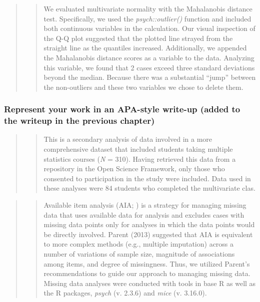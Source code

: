 \documentclass[
  11pt,
]{book}
\begin{document}
\begin{quote}
\begin{quote}
We evaluated multivariate normality with the Mahalanobis distance test. Specifically, we used the \emph{psych::outlier()} function and included both continuous variables in the calculation. Our visual inspection of the Q-Q plot suggested that the plotted line strayed from the straight line as the quantiles increased. Additionally, we appended the Mahalanobis distance scores as a variable to the data. Analyzing this variable, we found that 2 cases exceed three standard deviations beyond the median. Because there was a substantial ``jump'' between the non-outliers and these two variables we chose to delete them.
\end{quote}
\end{quote}

\hypertarget{represent-your-work-in-an-apa-style-write-up-added-to-the-writeup-in-the-previous-chapter-1}{%
\subsubsection*{Represent your work in an APA-style write-up (added to the writeup in the previous chapter)}\label{represent-your-work-in-an-apa-style-write-up-added-to-the-writeup-in-the-previous-chapter-1}}


\begin{quote}
\begin{quote}
This is a secondary analysis of data involved in a more comprehensive dataset that included students taking multiple statistics courses (\emph{N} = 310). Having retrieved this data from a repository in the Open Science Framework, only those who consented to participation in the study were included. Data used in these analyses were 84 students who completed the multivariate clas.
\end{quote}
\end{quote}

\begin{quote}
\begin{quote}
Available item analysis (AIA; \citep{parent_handling_2013}) is a strategy for managing missing data that uses available data for analysis and excludes cases with missing data points only for analyses in which the data points would be directly involved. Parent (2013) suggested that AIA is equivalent to more complex methods (e.g., multiple imputation) across a number of variations of sample size, magnitude of associations among items, and degree of missingness. Thus, we utilized Parent's recommendations to guide our approach to managing missing data. Missing data analyses were conducted with tools in base R as well as the R packages, \emph{psych} (v. 2.3.6) and \emph{mice} (v. 3.16.0).
\end{quote}
\end{quote}
\end{document}
